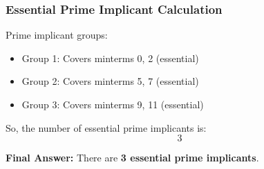 \documentclass[12pt,a4paper]{article}
\begin{document}
\subsubsection*{Essential Prime Implicant Calculation}

Prime implicant groups:
\begin{itemize}
    \item Group 1: Covers minterms 0, 2 (essential)
    \item Group 2: Covers minterms 5, 7 (essential)
    \item Group 3: Covers minterms 9, 11 (essential)
\end{itemize}

So, the number of essential prime implicants is:
\[
\boxed{3}
\]

\textbf{Final Answer:} There are \textbf{3 essential prime implicants}.
\end{document}
